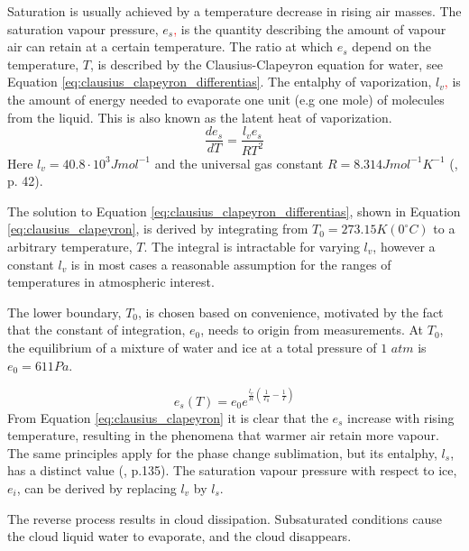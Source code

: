 Saturation is usually achieved by a temperature decrease in rising air masses. The saturation vapour pressure, $e_s$\textcolor{red}{,} is the quantity describing the amount of vapour air can retain at a certain temperature. The ratio at which $e_s$ depend on the temperature, $T$, is described by the Clausius-Clapeyron equation for water, see Equation \eqref{eq:clausius_clapeyron_differentias}. The entalphy of vaporization, $l_v$\textcolor{red}{,} is the amount of energy needed to evaporate one unit (e.g one mole) of molecules from the liquid. This is also known as the latent heat of vaporization. 
\begin{equation} \label{eq:clausius_clapeyron_differentias}
    \frac{de_s}{dT} = \frac{l_v e_s}{R T^2}
\end{equation}
Here $l_v = 40.8 \cdot 10^3 J mol^{-1}$ and the universal gas constant $R= 8.314 J mol^{-1} K^{-1}$ (\cite{cloud_phys_book_johanne}, p. 42). 

The solution to Equation \eqref{eq:clausius_clapeyron_differentias}, shown in Equation \eqref{eq:clausius_clapeyron}, is derived by integrating from $T_0 = 273.15K \left(0 ^{\circ}C \right)$ to a arbitrary temperature, $T$. The integral is intractable for varying $l_v$, however a constant $l_v$ is in most cases a reasonable assumption for the ranges of temperatures in atmospheric interest.

The lower boundary, $T_0$, is chosen based on convenience, motivated by the fact that the constant of integration,  $e_0$, needs to origin from measurements. At $T_0$, the equilibrium of a mixture of water and ice at a total pressure of $1$ $atm$ is $e_0 = 611Pa$. 

\begin{equation} \label{eq:clausius_clapeyron}
    e_s\left( T \right) = e_0 e^{\frac{l_v}{R} \left( \frac{1}{T_0} - \frac{1}{T} \right) }
\end{equation}
From Equation \eqref{eq:clausius_clapeyron} it is clear that the $e_s$ increase with rising temperature, resulting in the phenomena that warmer air retain more vapour. The same principles apply for the phase change sublimation, but its entalphy, $l_s$, has a distinct value (\cite{cloud_phys_book_johanne}, p.135). The saturation vapour pressure with respect to ice, $e_i$, can be derived by replacing $l_v$ by $l_s$.

The reverse process results in cloud dissipation. Subsaturated conditions cause the cloud liquid water to evaporate, and the cloud disappears. 

